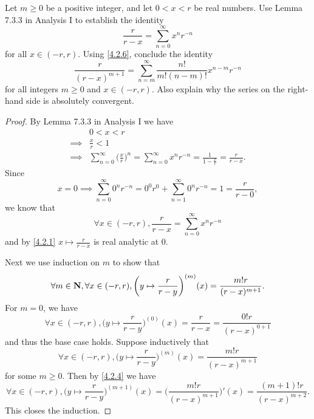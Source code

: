 \begin{exercise}\label{ex 4.2.7}
  Let \(m \geq 0\) be a positive integer, and let \(0 < x < r\) be real numbers.
  Use Lemma 7.3.3 in Analysis I to establish the identity
  \[
    \frac{r}{r - x} = \sum_{n = 0}^\infty x^n r^{-n}
  \]
  for all \(x \in (-r, r)\).
  Using \cref{4.2.6}, conclude the identity
  \[
    \frac{r}{(r - x)^{m + 1}} = \sum_{n = m}^\infty \frac{n!}{m! (n - m)!} x^{n - m} r^{-n}
  \]
  for all integers \(m \geq 0\) and \(x \in (-r, r)\).
  Also explain why the series on the right-hand side is absolutely convergent.
\end{exercise}

\begin{proof}
  By Lemma 7.3.3 in Analysis I we have
  \begin{align*}
             & 0 < x < r                                                                                                                     \\
    \implies & \frac{x}{r} < 1                                                                                                               \\
    \implies & \sum_{n = 0}^\infty \bigg(\frac{x}{r}\bigg)^n = \sum_{n = 0}^\infty x^n r^{-n} = \frac{1}{1 - \frac{x}{r}} = \frac{r}{r - x}.
  \end{align*}
  Since
  \[
    x = 0 \implies \sum_{n = 0}^\infty 0^n r^{-n} = 0^0 r^{0} + \sum_{n = 1}^\infty 0^n r^{-n} = 1 = \frac{r}{r - 0},
  \]
  we know that
  \[
    \forall x \in (-r, r), \frac{r}{r - x} = \sum_{n = 0}^\infty x^n r^{-n}
  \]
  and by \cref{4.2.1} \(x \mapsto \frac{r}{r - x}\) is real analytic at \(0\).

  Next we use induction on \(m\) to show that
  \[
    \forall m \in \mathbf{N}, \forall x \in (-r, r), \bigg(y \mapsto \frac{r}{r - y}\bigg)^{(m)}(x) = \frac{m! r}{(r - x)^{m + 1}}.
  \]
  For \(m = 0\), we have
  \[
    \forall x \in (-r, r), \bigg(y \mapsto \frac{r}{r - y}\bigg)^{(0)}(x) = \frac{r}{r - x} = \frac{0! r}{(r - x)^{0 + 1}}
  \]
  and thus the base case holds.
  Suppose inductively that
  \[
    \forall x \in (-r, r), \bigg(y \mapsto \frac{r}{r - y}\bigg)^{(m)}(x) = \frac{m! r}{(r - x)^{m + 1}}
  \]
  for some \(m \geq 0\).
  Then by \cref{4.2.4} we have
  \[
    \forall x \in (-r, r), \bigg(y \mapsto \frac{r}{r - y}\bigg)^{(m + 1)}(x) = \bigg(\frac{m! r}{(r - x)^{m + 1}}\bigg)'(x) = \frac{(m + 1)! r}{(r - x)^{m + 2}}.
  \]
  This closes the induction.


\end{proof}
